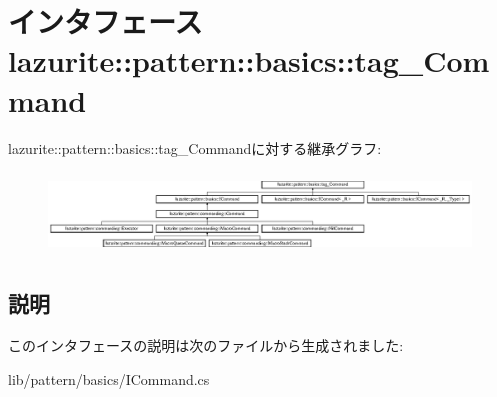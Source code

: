 \hypertarget{interfacelazurite_1_1pattern_1_1basics_1_1tag___command}{
\section{インタフェース lazurite::pattern::basics::tag\_\-Command}
\label{interfacelazurite_1_1pattern_1_1basics_1_1tag___command}
}
lazurite::pattern::basics::tag\_\-Commandに対する継承グラフ:\begin{figure}[H]
\begin{center}
\leavevmode
\includegraphics[height=2.20126cm]{interfacelazurite_1_1pattern_1_1basics_1_1tag___command}
\end{center}
\end{figure}


\subsection{説明}


このインタフェースの説明は次のファイルから生成されました:\begin{DoxyCompactItemize}
\item 
lib/pattern/basics/ICommand.cs\end{DoxyCompactItemize}
